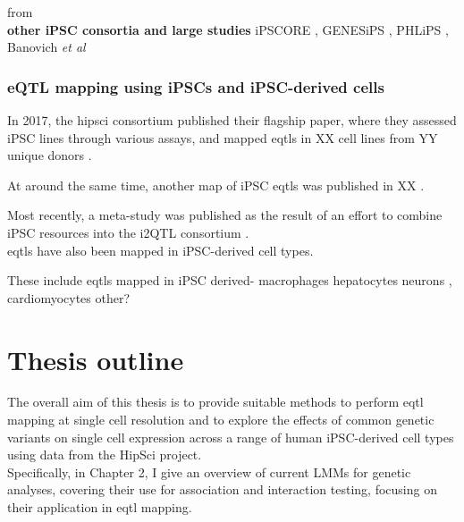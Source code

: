 from \cite{kilpinen2017common}\\


\textbf{other iPSC consortia and large studies}
iPSCORE \cite{panopoulos2017ipscore}, GENESiPS \cite{carcamo2017analysis}, PHLiPS \cite{pashos2017large}, Banovich \textit{et al} \cite{banovich2018impact}

\subsubsection{eQTL mapping using iPSCs and iPSC-derived cells}

In 2017, the \gls{hipsci} consortium published their flagship paper, where they assessed iPSC lines through various assays, and mapped \glspl{eqtl} in XX cell lines from YY unique donors
\cite{kilpinen2017common}.

At around the same time, another map of iPSC \glspl{eqtl} was published in XX \cite{deboever2017large}.

\cite{warren2017induced}

Most recently, a meta-study was published as the result of an effort to combine iPSC resources into the i2QTL consortium  
\cite{bonder2019systematic}.\\

\glspl{eqtl} have also been mapped in iPSC-derived cell types.

These include \glspl{eqtl} mapped in iPSC derived- 
macrophages \cite{alasoo2018shared}
hepatocytes \cite{pashos2017large}
neurons \cite{schwartzentruber2018molecular}, 
cardiomyocytes \cite{strober2019dynamic, banovich2018impact}
other?




\newpage

\section{Thesis outline}

The overall aim of this thesis is to provide suitable methods to perform \gls{eqtl} mapping at single cell resolution and to explore the effects of common genetic variants on single cell expression across a range of human iPSC-derived cell types using data from the HipSci project.\\

Specifically, in Chapter 2, I give an overview of current LMMs for genetic analyses, covering their use for association and interaction testing, focusing on their application in \gls{eqtl} mapping.\\

